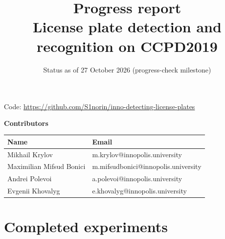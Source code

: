 \documentclass[11pt]{article}
\title{Progress report\\ \large License plate detection and recognition on CCPD2019}
\date{Status as of 27 October 2026 (progress-check milestone)}
\begin{document}
\maketitle

\noindent Code: \url{https://github.com/S1norin/inno-detecting-license-plates}

\bigskip
\textbf{Contributors}

\begin{center}
\begin{tabular}{@{}ll@{}}
\toprule
Name & Email \\
\midrule
Mikhail Krylov & m.krylov@innopolis.university \\
Maximilian Mifsud Bonici & m.mifsudbonici@innopolis.university \\
Andrei Polevoi & a.polevoi@innopolis.university \\
Evgenii Khovalyg & e.khovalyg@innopolis.university \\
\bottomrule
\end{tabular}
\end{center}

\section{Completed experiments}
\end{document}
